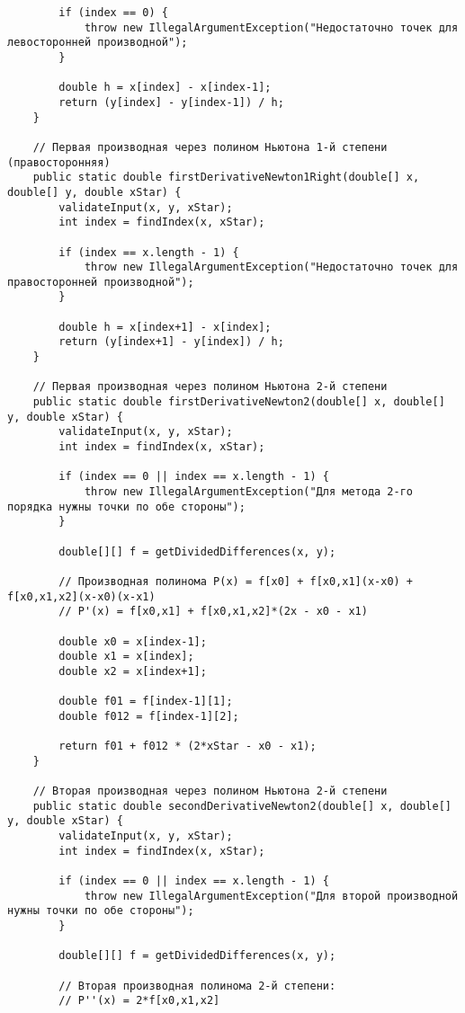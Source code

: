\begin{verbatim}
        if (index == 0) {
            throw new IllegalArgumentException("Недостаточно точек для левосторонней производной");
        }

        double h = x[index] - x[index-1];
        return (y[index] - y[index-1]) / h;
    }

    // Первая производная через полином Ньютона 1-й степени (правосторонняя)
    public static double firstDerivativeNewton1Right(double[] x, double[] y, double xStar) {
        validateInput(x, y, xStar);
        int index = findIndex(x, xStar);

        if (index == x.length - 1) {
            throw new IllegalArgumentException("Недостаточно точек для правосторонней производной");
        }

        double h = x[index+1] - x[index];
        return (y[index+1] - y[index]) / h;
    }

    // Первая производная через полином Ньютона 2-й степени
    public static double firstDerivativeNewton2(double[] x, double[] y, double xStar) {
        validateInput(x, y, xStar);
        int index = findIndex(x, xStar);

        if (index == 0 || index == x.length - 1) {
            throw new IllegalArgumentException("Для метода 2-го порядка нужны точки по обе стороны");
        }

        double[][] f = getDividedDifferences(x, y);

        // Производная полинома P(x) = f[x0] + f[x0,x1](x-x0) + f[x0,x1,x2](x-x0)(x-x1)
        // P'(x) = f[x0,x1] + f[x0,x1,x2]*(2x - x0 - x1)

        double x0 = x[index-1];
        double x1 = x[index];
        double x2 = x[index+1];

        double f01 = f[index-1][1];
        double f012 = f[index-1][2];

        return f01 + f012 * (2*xStar - x0 - x1);
    }

    // Вторая производная через полином Ньютона 2-й степени
    public static double secondDerivativeNewton2(double[] x, double[] y, double xStar) {
        validateInput(x, y, xStar);
        int index = findIndex(x, xStar);

        if (index == 0 || index == x.length - 1) {
            throw new IllegalArgumentException("Для второй производной нужны точки по обе стороны");
        }

        double[][] f = getDividedDifferences(x, y);

        // Вторая производная полинома 2-й степени:
        // P''(x) = 2*f[x0,x1,x2]


\end{verbatim}
